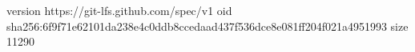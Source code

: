 version https://git-lfs.github.com/spec/v1
oid sha256:6f9f71e62101da238e4c0ddb8ccedaad437f536dce8e081ff204f021a4951993
size 11290
